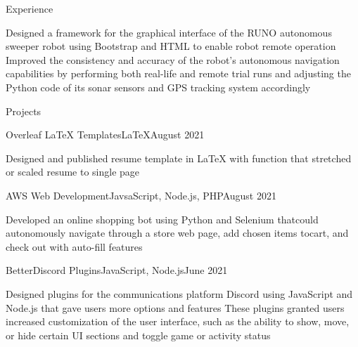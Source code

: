 \documentclass[]{cv_template}
\begin{document}
\begin{cv}
\begin{cvsection}{Experience}
\begin{cvsubsection}
\listitem Designed a framework for the graphical interface of the RUNO autonomous sweeper robot using Bootstrap and HTML to enable robot remote operation
\listitem Improved the consistency and accuracy of the robot's autonomous navigation capabilities by performing both real-life and remote trial runs and adjusting the Python code of its sonar sensors and GPS tracking system accordingly

\end{cvsubsection}


\end{cvsection}


\begin{cvsection}{Projects}


\begin{cvsubsection}
{Overleaf LaTeX Templates}{LaTeX}{August 2021}{}

\listitem Designed and published resume template in LaTeX with function that stretched or scaled resume to single page

\end{cvsubsection}


\begin{cvsubsection}
{AWS Web Development}{JavsaScript, Node.js, PHP}{August 2021}{}

\listitem Developed an online shopping bot using Python and Selenium thatcould autonomously navigate through a store web page, add chosen items tocart, and check out with auto-fill features

\end{cvsubsection}


\begin{cvsubsection}
{BetterDiscord Plugins}{JavaScript, Node.js}{June 2021}{}

\listitem Designed plugins for the communications platform Discord using JavaScript and Node.js that gave users more options and features
\listitem These plugins granted users increased customization of the user interface, such as the ability to show, move, or hide certain UI sections and toggle game or activity status


\end{cvsubsection}
\end{cvsection}
\end{cv}
\end{document}
